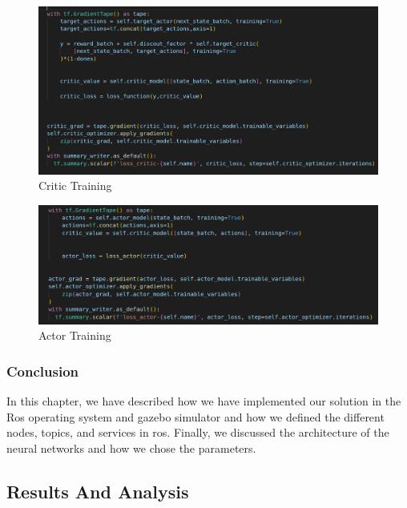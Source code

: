 \documentclass[12pt]{extarticle}
\begin{document}
    
 \begin{figure}[H]  
\centering
\includegraphics[scale=0.30]{critic_training}
\caption[Critic Training]{Critic Training}
\label{cc:t}
\end{figure}




   
 \begin{figure}[H]  
\centering
\includegraphics[scale=0.35]{actor_training}
\caption[Actor Training]{Actor Training}
\label{ac:t}
\end{figure}

\subsubsection{Conclusion}
In this chapter, we have described how we have implemented our solution in the Ros operating system and gazebo simulator and how we defined the different nodes, topics, and services in ros. Finally, we discussed the architecture of the neural networks and how we chose the parameters.






\subsection{Results And Analysis}
\end{document}
